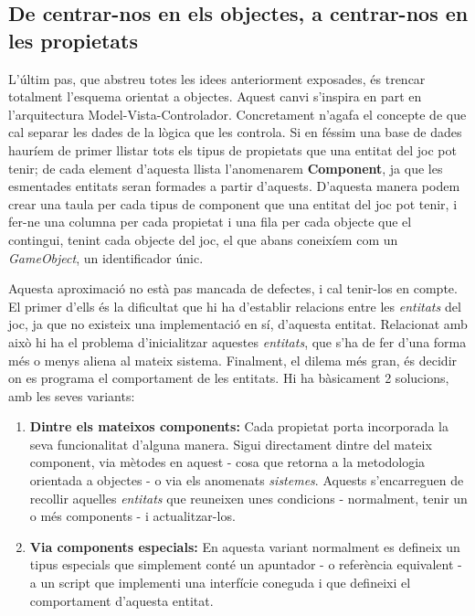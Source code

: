 \subsection{De centrar-nos en els objectes, a centrar-nos en les propietats}

L'últim pas, que abstreu totes les idees anteriorment exposades, és trencar totalment l'esquema orientat a objectes. Aquest canvi s'inspira en part en l'arquitectura Model-Vista-Controlador. Concretament n'agafa el concepte de que cal separar les dades de la lògica que les controla. Si en féssim una base de dades hauríem de primer llistar tots els tipus de propietats que una entitat del joc pot tenir; de cada element d'aquesta llista l'anomenarem {\bf Component}, ja que les esmentades entitats seran formades a partir d'aquests. D'aquesta manera podem crear una taula per cada tipus de component que una entitat del joc pot tenir, i fer-ne una columna per cada propietat i una fila per cada objecte que el contingui, tenint cada objecte del joc, el que abans coneixíem com un {\em GameObject}, un identificador únic.

Aquesta aproximació no està pas mancada de defectes, i cal tenir-los en compte. El primer d'ells és la dificultat que hi ha d'establir relacions entre les {\em entitats} del joc, ja que no existeix una implementació en sí, d'aquesta entitat. Relacionat amb això hi ha el problema d'inicialitzar aquestes {\em entitats}, que s'ha de fer d'una forma més o menys aliena al mateix sistema. Finalment, el dilema més gran, és decidir on es programa el comportament de les entitats. Hi ha bàsicament 2 solucions, amb les seves variants:

\begin{enumerate}
  \item {\bf Dintre els mateixos components:} Cada propietat porta incorporada la seva funcionalitat d'alguna manera. Sigui directament dintre del mateix component, via mètodes en aquest - cosa que retorna a la metodologia orientada a objectes - o via els anomenats {\em sistemes}. Aquests s'encarreguen de recollir aquelles {\em entitats} que reuneixen unes condicions - normalment, tenir un o més components - i actualitzar-los.
    
  \item {\bf Via components especials:} En aquesta variant normalment es defineix un tipus especials que simplement conté un apuntador - o referència equivalent - a un script que implementi una interfície coneguda i que defineixi el comportament d'aquesta entitat.
    
\end{enumerate}

